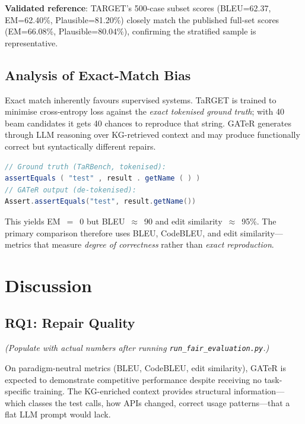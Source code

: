 \documentclass[conference,10pt]{IEEEtran}
\begin{document}
\textbf{Validated reference}: TARGET's 500-case subset scores (BLEU=62.37,
EM=62.40\%, Plausible=81.20\%) closely match the published full-set scores
(EM=66.08\%, Plausible=80.04\%), confirming the stratified sample is
representative.

\subsection{Analysis of Exact-Match Bias}
\label{sec:bias}

Exact match inherently favours supervised systems. TaRGET is trained to
minimise cross-entropy loss against the \emph{exact tokenised ground
truth}; with 40 beam candidates it gets 40 chances to reproduce that
string. GATeR generates through LLM reasoning over KG-retrieved context
and may produce functionally correct but syntactically different repairs.

\begin{lstlisting}[language=Java,caption={Functionally identical repairs scored EM=0}]
// Ground truth (TaRBench, tokenised):
assertEquals ( "test" , result . getName ( ) )
// GATeR output (de-tokenised):
Assert.assertEquals("test", result.getName())
\end{lstlisting}

This yields EM~$=$~0 but BLEU~$\approx$~90 and edit
similarity~$\approx$~95\%. The primary comparison therefore uses BLEU,
CodeBLEU, and edit similarity---metrics that measure \emph{degree of
correctness} rather than \emph{exact reproduction}.

\section{Discussion}
\label{sec:discussion}

\subsection{RQ1: Repair Quality}

\emph{(Populate with actual numbers after running
\texttt{run\_fair\_evaluation.py}.)}

On paradigm-neutral metrics (BLEU, CodeBLEU, edit similarity), GATeR is
expected to demonstrate competitive performance despite receiving no
task-specific training. The KG-enriched context provides structural
information---which classes the test calls, how APIs changed, correct
usage patterns---that a flat LLM prompt would lack.
\end{document}

